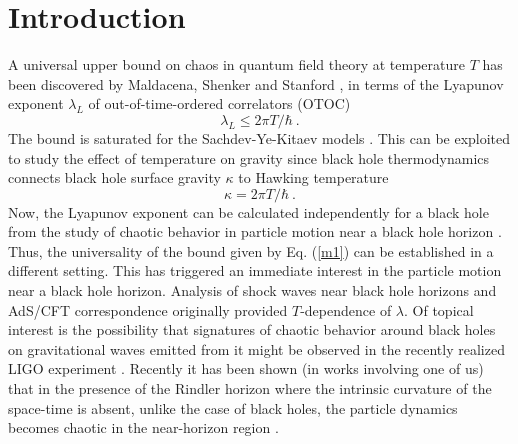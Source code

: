 \documentclass[aps,prd,showpacs,nofootinbib,floats,floatfix,preprintnumbers,groupedaddress,twocolumn]{revtex4-1}
\begin{document}
\section{Introduction}
%
%
%
%
%
\par\noindent
A universal upper bound on chaos in quantum field theory at temperature $T$ has been discovered by Maldacena, Shenker and Stanford \cite{Maldacena:2015waa}, in terms of the  Lyapunov exponent $\lambda_L$ of out-of-time-ordered correlators (OTOC)
\begin{equation}
\lambda_L \leq 2\pi T/\hbar ~.
 \label{m1}   
\end{equation}
The bound is saturated for the Sachdev-Ye-Kitaev models \cite{sy,k}. This can be exploited to study the effect of temperature on gravity since black hole thermodynamics connects black hole surface gravity $\kappa$  to Hawking temperature
\begin{equation}
\kappa = 2\pi T/\hbar ~.
 \label{m2}   
\end{equation}
Now, the Lyapunov exponent can be calculated independently for a black hole from the study of chaotic   behavior in particle motion near   a black hole horizon \cite{Hashimoto:2016dfz,Hashimoto:2018fkb}. Thus, the universality of the bound given by Eq.  (\ref{m1}) can be established in a different setting. This has triggered an immediate interest in the particle motion near a black hole horizon. Analysis of shock waves near black hole
horizons \cite{3} and AdS/CFT correspondence \cite{10} originally provided $T$-dependence of $\lambda$. Of topical interest is the possibility that signatures of chaotic behavior around
black holes  on gravitational waves emitted from it \cite{49} might be observed in the recently realized  LIGO experiment \cite{52}.
Recently it has been shown (in works involving one of us) that in the presence of the Rindler horizon where the intrinsic curvature of the space-time is absent, unlike the case of black holes, the particle dynamics becomes chaotic in the near-horizon region \cite{Dalui:2018qqv,Dalui:2019umw}. 
\end{document}
